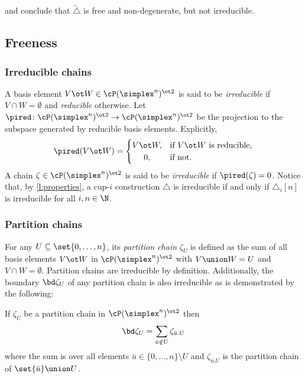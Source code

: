 \medskip\noindent and conclude that $\widetilde\triangle$ is free and non-degenerate, but not irreducible.

\subsection{Freeness}

\subsubsection{Irreducible chains}

A basis element $V \ot W \in \cP(\simplex^n)^{\ot 2}$ is said to be \textit{irreducible} if $V \cap W = \emptyset$ and \textit{reducible} otherwise.
Let $\pired \colon \cP(\simplex^n)^{\ot 2} \to \cP(\simplex^n)^{\ot 2}$ be the projection to the subspace generated by reducible basis elements.
Explicitly,
\[
\pired(V \ot W) =
\begin{cases}
	V \ot W, & \text{if $V \ot W$ is reducible},\\
	\hfil 0, & \text{if not}.
\end{cases}
\]
A chain $\zeta \in \cP(\simplex^n)^{\ot 2}$ is said to be \textit{irreducible} if $\pired(\zeta) = 0$.
Notice that, by \cref{l:properties}, a cup-$i$ construction $\triangle$ is irreducible if and only if $\triangle_i[n]$ is irreducible for all $i, n \in \N$.

\subsubsection{Partition chains}

For any $U \subseteq \set{0,\dots,n}$, its \textit{partition chain} $\zeta_U$ is defined as the sum of all basis elements $V \ot W$ in $\cP(\simplex^n)^{\ot 2}$ with $V \union W = U$ and $V \cap W = \emptyset$.
Partition chains are irreducible by definition.
Additionally, the boundary $\bd \zeta_U$ of any partition chain is also irreducible as is demonstrated by the following:

\begin{lemma}\label{l:partition chains}
	If $\zeta_U$ be a partition chain in $\cP(\simplex^n)^{\ot 2}$ then
	\[
	\bd \zeta_U = \sum_{\bar u \notin U} \zeta_{\bar u.U}
	\]
	where the sum is over all elements $\bar u \in \{0,\dots,n\} \setminus U$ and $\zeta_{\bar u.U}$ is the partition chain of $\set{\bar u} \union U$.
\end{lemma}

